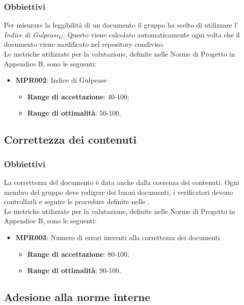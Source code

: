 \subsubsection{Obbiettivi}
Per misurare la leggibilità di un documento il gruppo ha scelto di utilizzare l' \textit{Indice di Gulpease$_{G}$}. Questo viene calcolato automaticamente ogni volta che il documento viene modificato nel repository condiviso.\\
Le metriche utilizzate per la valutazione, definite nelle Norme di Progetto in Appendice B, sono le seguenti:
\begin{itemize}
	\item \textbf{MPR002}: Indice di Gulpease
	\begin{itemize}
		\item \textbf{Range di accettazione}: 40-100;
		\item \textbf{Range di ottimalità}: 50-100.
	\end{itemize}
\end{itemize}
\subsection{Correttezza dei contenuti}
\subsubsection{Obbiettivi}
La correttezza del documento è data anche dalla coerenza dei contenuti. Ogni membro del gruppo deve redigere dei buoni documenti, i verificatori devono controllarli e seguire le procedure definite nelle \normediprogetto.\\
Le metriche utilizzate per la valutazione, definite nelle Norme di Progetto in Appendice B, sono le seguenti:
\begin{itemize}
	\item \textbf{MPR003}: Numero di errori inerenti alla correttezza dei documenti
	\begin{itemize}
		\item \textbf{Range di accettazione}: 80-100;
		\item \textbf{Range di ottimalità}: 90-100.
	\end{itemize}
\end{itemize}
\subsection{Adesione alla norme interne}
